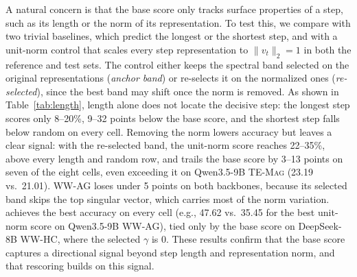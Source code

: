 A natural concern is that the base score only tracks surface properties of a step, such as its length or the norm of its representation. To test this, we compare \soap{} with two trivial baselines, which predict the longest or the shortest step, and with a unit-norm control that scales every step representation to $\lVert v_t \rVert_2 = 1$ in both the reference and test sets. The control either keeps the spectral band selected on the original representations (\emph{anchor band}) or re-selects it on the normalized ones (\emph{re-selected}), since the best band may shift once the norm is removed. As shown in Table~\ref{tab:length}, length alone does not locate the decisive step: the longest step scores only 8--20\%, 9--32 points below the base score, and the shortest step falls below random on every cell. Removing the norm lowers accuracy but leaves a clear signal: with the re-selected band, the unit-norm score reaches 22--35\%, above every length and random row, and trails the base score by 3--13 points on seven of the eight cells, even exceeding it on Qwen3.5-9B \textsc{TE-Mag} (23.19 vs.\ 21.01). \textsc{WW-AG} loses under 5 points on both backbones, because its selected band skips the top singular vector, which carries most of the norm variation. \soap{} achieves the best accuracy on every cell (e.g., 47.62 vs.\ 35.45 for the best unit-norm score on Qwen3.5-9B \textsc{WW-AG}), tied only by the base score on DeepSeek-8B \textsc{WW-HC}, where the selected $\gamma$ is 0. These results confirm that the base score captures a directional signal beyond step length and representation norm, and that rescoring builds on this signal.

